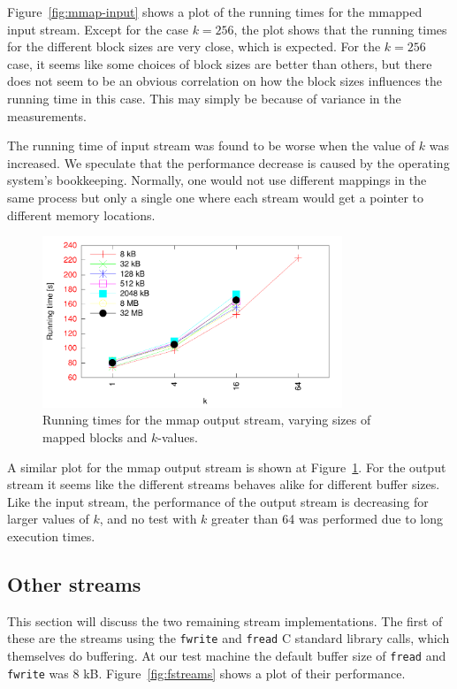 \documentclass[a4paper,12pt]{article}
\begin{document}
Figure~\ref{fig:mmap-input} shows a plot of the running times for the
mmapped input stream. Except for the case $k = 256$, the plot shows
that the running times for the different block sizes are very close,
which is expected. For the $k = 256$ case, it seems like some choices
of block sizes are better than others, but there does not seem to be an
obvious correlation on how the block sizes influences the running time
in this case. This may simply be because of variance in the
measurements.

The running time of input stream was found to be worse when the value
of $k$ was increased. We speculate that the performance decrease is caused by the operating system's bookkeeping. Normally, one would not use different mappings in the same process but only a single one where each stream would get a pointer to different memory locations.

\begin{figure}[h!]
  \centering
  \includegraphics[width=0.8\textwidth]{mmap_output}
  \caption{Running times for the mmap output stream, varying sizes of
    mapped blocks and $k$-values.}
  \label{fig:mmap-output}
\end{figure}

A similar plot for the mmap output stream is shown at
Figure~\ref{fig:mmap-output}. For the output stream it seems like the
different streams behaves alike for different buffer sizes. Like the
input stream, the performance of the output stream is decreasing for
larger values of $k$, and no test with $k$ greater than 64 was
performed due to long execution times.

\subsection{Other streams}
\label{sec:other-streams}
This section will discuss the two remaining stream
implementations. The first of these are the streams using the
\texttt{fwrite} and \texttt{fread} C standard library calls, which
themselves do buffering. At our test machine the default buffer size
of \texttt{fread} and \texttt{fwrite} was 8
kB. Figure~\ref{fig:fstreams} shows a plot of their performance.
\end{document}
